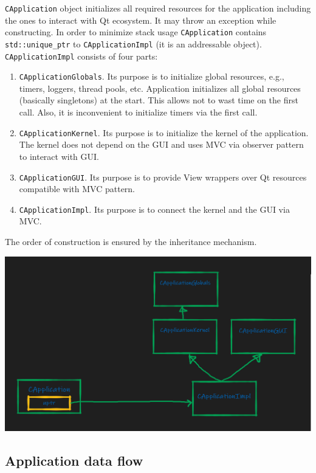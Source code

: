 \documentclass{article}
\begin{document}
\verb"CApplication" object initializes all required resources for the application including the ones to interact with Qt ecosystem. It may throw an exception while constructing. In order to minimize stack usage \verb"CApplication" contains \verb"std::unique_ptr" to \verb"CApplicationImpl" (it is an addressable object). \verb"CApplicationImpl" consists of four parts:
\begin{enumerate}
\item \verb"CApplicationGlobals". Its purpose is to initialize global resources, e.g., timers, loggers, thread pools, etc. Application initializes all global resources (basically singletons) at the start. This allows not to wast time on the first call. Also, it is inconvenient to initialize timers via the first call.

\item \verb"CApplicationKernel". Its purpose is to initialize the kernel of the application. The kernel does not depend on the GUI and uses MVC via observer pattern to interact with GUI.
\item \verb"CApplicationGUI". Its purpose is to provide View wrappers over Qt resources compatible with MVC pattern.

\item \verb"CApplicationImpl". Its purpose is to connect the kernel and the GUI via MVC.
\end{enumerate}
The order of construction is ensured by the inheritance mechanism.
\begin{center}
\includegraphics[scale = 0.3]{Figures/CApplicationStructure.png}
\end{center}

\subsection{Application data flow}
\end{document}
